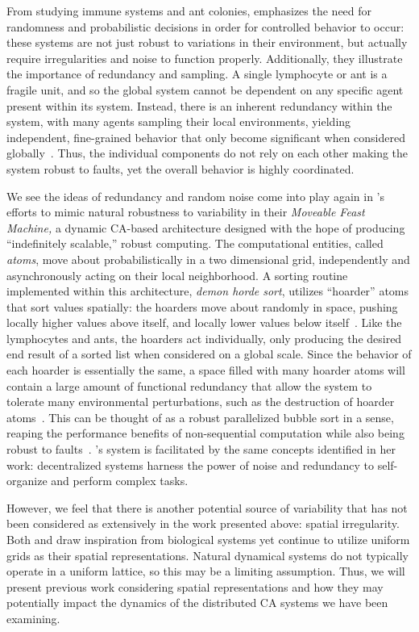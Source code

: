 \documentclass[a4paper,11pt,twoside]{report}
\begin{document}
From studying immune systems and ant colonies, \citeauthor{mi05} emphasizes the need for randomness and probabilistic decisions in order for controlled behavior to occur: these systems are not just robust to variations in their environment, but actually require irregularities and noise to function properly. Additionally, they illustrate the importance of redundancy and sampling. A single lymphocyte or ant is a fragile unit, and so the global system cannot be dependent on any specific agent present within its system. Instead, there is an inherent redundancy within the system, with many agents sampling their local environments, yielding independent, fine-grained behavior that only become significant when considered globally~\cite{mi05}. Thus, the individual components do not rely on each other making the system robust to faults, yet the overall behavior is highly coordinated. 

We see the ideas of redundancy and random noise come into play again in \citeauthor{ac14}'s efforts to mimic natural robustness to variability in their \textit{Moveable Feast Machine,} a dynamic CA-based architecture designed with the hope of producing ``indefinitely scalable,'' robust computing. The computational entities, called \textit{atoms}, move about probabilistically in a two dimensional grid, independently and asynchronously acting on their local neighborhood. A sorting routine implemented within this architecture, \textit{demon horde sort}, utilizes ``hoarder'' atoms that sort values spatially: the hoarders move about randomly in space, pushing locally higher values above itself, and locally lower values below itself~\cite{ac12}. Like the lymphocytes and ants, the hoarders act individually, only producing the desired end result of a sorted list when considered on a global scale. Since the behavior of each hoarder is essentially the same, a space filled with many hoarder atoms will contain a large amount of functional redundancy that allow the system to tolerate many environmental perturbations, such as the destruction of hoarder atoms~\cite{ac14}. This can be thought of as a robust parallelized bubble sort in a sense, reaping the performance benefits of non-sequential computation while also being robust to faults~\cite{ac13,ch89}. \citeauthor{ac14}'s system is facilitated by the same concepts \citeauthor{mi05} identified in her work: decentralized systems harness the power of noise and redundancy to self-organize and perform complex tasks.

However, we feel that there is another potential source of variability that has not been considered as extensively in the work presented above: spatial irregularity. Both \citeauthor{me07} and \citeauthor{ac14} draw inspiration from biological systems yet continue to utilize uniform grids as their spatial representations. Natural dynamical systems do not typically operate in a uniform lattice, so this may be a limiting assumption. Thus, we will present previous work considering spatial representations and how they may potentially impact the dynamics of the distributed CA systems we have been examining.
\end{document}
